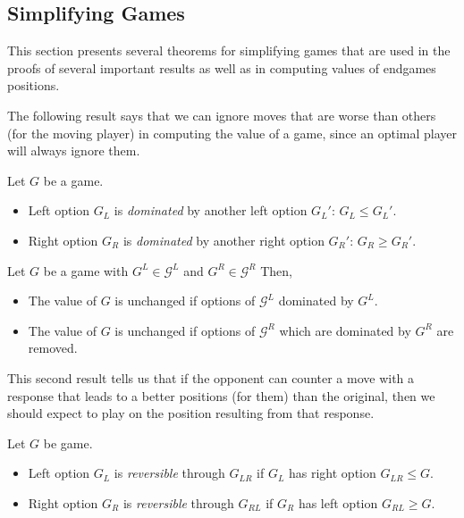 \documentclass[../math194_paper.tex]{subfiles}
\begin{document}
\subsection{Simplifying Games}

This section presents several theorems for simplifying games that are 
used in the proofs of several important results as well as in computing 
values of endgames positions. 

The following result says that we can ignore moves that are worse than 
others (for the moving player) in computing the value of a game, since 
an optimal player will always ignore them.

\begin{definition} Let $G$ be a game.
    \begin{itemize}
        \item Left option $G_L$ is \textit{dominated} by another left option $G_L'$:
        $G_L \leq G_L'$.
        \item Right option $G_R$ is \textit{dominated} by another right option $G_R'$:
        $G_R \geq G_R'$.
    \end{itemize}
\end{definition}

\begin{theorem}
    Let $G$ be a game with $G^L \in \mathcal{G}^L$ and $G^R \in \mathcal{G}^R$ Then,
    \begin{itemize}
        \item The value of $G$ is unchanged if options of $\mathcal{G}^L$ dominated by $G^L$.
        \item The value of $G$ is unchanged if options of $\mathcal{G}^R$ 
    which are dominated by $G^R$ are removed. 
    \end{itemize}
\end{theorem}

\begin{figure}[H]

\end{figure}

This second result tells us that if the opponent can counter a move with a 
response that leads to a better positions (for them) than the original, then we 
should expect to play on the position resulting from that response.
\begin{definition} 
    Let $G$ be game. 
    \begin{itemize}
        \item Left option $G_L$ is \textit{reversible} through $G_{LR}$ if
        $G_L$ has right option $G_{LR} \leq G$. 
        \item Right option $G_R$ is \textit{reversible} through $G_{RL}$ if 
        $G_R$ has left option $G_{RL} \geq G$.
    \end{itemize}
\end{definition}
\end{document}
